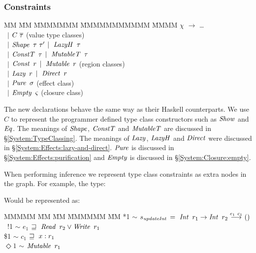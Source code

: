 \subsubsection{Constraints}
\vspace{-1ex}
\begin{tabbing}
	MM 	\= MM \= MMMMMMM \= MMMMMMMMMMM \= MMMM \kill
	$\chi$ 	\> $\to$	\> \dots 
		\\[0.5ex]
		\> \ $\mid$	\> $C \ \overline{\tau}$ 
				\> \> (value type classes)
		\\[0.5ex]
		\> \ $\mid$	\> $\operatorname{\mathit{Shape}} \ \tau \ \tau'$ 
						\> $\mid \ \operatorname{\mathit{LazyH}} \ \tau$ 
				\> 
		\\[0.5ex]
		\> \ $\mid$	\> $\operatorname{\mathit{ConstT}} \ \tau$	\> $\mid \ \operatorname{\mathit{MutableT}} \ \tau$
				\> 
		\\[0.5ex]
		\> \ $\mid$	\> $\operatorname{\mathit{Const}} \ r$ 	\> $\mid \ \operatorname{\mathit{Mutable}} \ r$	
				\> (region classes)	
		\\
		\> \ $\mid$	\> $\operatorname{\mathit{Lazy}} \ r$		\> $\mid \ \operatorname{\mathit{Direct}} \ r$  
				\> 
		\\[0.5ex]
		\> \ $\mid$	\> $\operatorname{\mathit{Pure}} \ \sigma$	\>				
				\> (effect class)	
		\\[0.5ex]
		\> \ $\mid$	\> $\operatorname{\mathit{Empty}} \ \varsigma$ \>				
				\> (closure class)	
\end{tabbing}

The new declarations behave the same way as their Haskell counterparts. We use $C$ to represent the programmer defined type class constructors such as $\operatorname{\mathit{Show}}$ and $\operatorname{\mathit{Eq}}$. The meanings of $\operatorname{\mathit{Shape}}$, $\operatorname{\mathit{ConstT}}$ and $\operatorname{\mathit{MutableT}}$ are discussed in \S\ref{System:TypeClassing}. The meanings of $\operatorname{\mathit{Lazy}}$, $\operatorname{\mathit{LazyH}}$ and $\operatorname{\mathit{Direct}}$ were discussed in \S\ref{System:Effects:lazy-and-direct}. $\operatorname{\mathit{Pure}}$ is discussed in \S\ref{System:Effects:purification} and $\operatorname{\mathit{Empty}}$ is discussed in \S\ref{System:Closure:empty}.

When performing inference we represent type class constraints as extra nodes in the graph. For example, the type:


Would be represented as:
\begin{tabbing}
MMMMM	\= MM 	\= MM 		\= MMMMMM 	\= MM \kill
	\> *1	\> $\sim$	\> $s_{\operatorname{\mathit{updateInt}}}$	
					\> $= \ \operatorname{\mathit{Int}} \ r_1 \to \operatorname{\mathit{Int}} \ r_2 \stackrel{e_1 \ c_1}{\longrightarrow} ()$ \\
	\> \ !1	\> $\sim$	\> $e_1$	\> $\tme \ \iRead \ r_2 \lor \iWrite \ r_1$ \\
	\> \$1	\> $\sim$	\> $c_1$	\> $\sqsupseteq \ x : r_1$ \\
	\> $\Diamond1$	\> $\sim$	\> $\operatorname{\mathit{Mutable}} \ r_1$ 
\end{tabbing}

